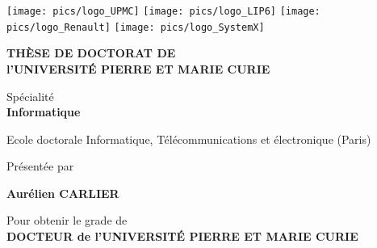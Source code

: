 \documentclass[11pt]{book}
\begin{document}
\thispagestyle{empty}

\texttt{[image: pics/logo\_UPMC]}\hfill
\texttt{[image: pics/logo\_LIP6]}\hfill
\texttt{[image: pics/logo\_Renault]}\hfill
\texttt{[image: pics/logo\_SystemX]}


{\large

\vspace*{1cm}

\begin{center}

{\bf TH{\`E}SE DE DOCTORAT DE \\ l'UNIVERSIT{\'E} PIERRE ET MARIE CURIE}

\vspace*{0.5cm}

Sp{\'e}cialit{\'e} \\ [2ex]
{\bf Informatique}\ \\ 

\vspace*{0.5cm}

Ecole doctorale Informatique, T{\'e}l{\'e}communications et {\'e}lectronique (Paris)

\vspace*{1cm}

Pr{\'e}sent{\'e}e par \ \\

\vspace*{0.5cm}

{\Large {\bf Aur{\'e}lien CARLIER}}

\vspace*{1cm}
Pour obtenir le grade de \ \\[1ex]
{\bf DOCTEUR de l'UNIVERSIT{\'E} PIERRE ET MARIE CURIE} \ \\

\vspace*{1cm}

\end{center}

}
\end{document}
